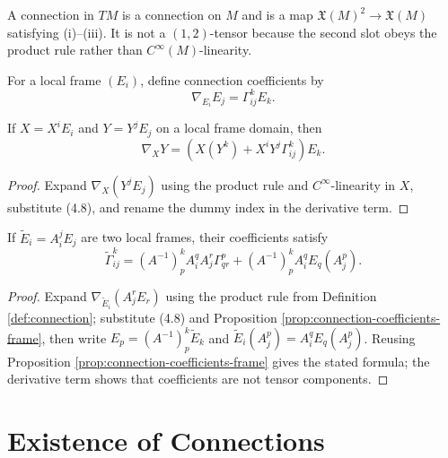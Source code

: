 A connection in $TM$ is a connection on $M$ and is a map $\mathfrak X(M)^2\to\mathfrak X(M)$ satisfying (i)--(iii). It is not a $(1,2)$-tensor because the second slot obeys the product rule rather than $C^\infty(M)$-linearity.

For a local frame $(E_i)$, define connection coefficients by
\begin{equation}
\nabla_{E_i}E_j=\Gamma^k_{ij}E_k.\tag{4.8}
\end{equation}
\begin{proposition}
\label{prop:connection-coefficients-frame}
\leanok
If $X=X^iE_i$ and $Y=Y^jE_j$ on a local frame domain, then
\begin{equation}
\nabla_XY=\left(X(Y^k)+X^iY^j\Gamma^k_{ij}\right)E_k.\tag{4.9}
\end{equation}
\end{proposition}
\begin{proof}
\sketch Expand $\nabla_X(Y^jE_j)$ using the product rule and $C^\infty$-linearity in $X$, substitute (4.8), and rename the dummy index in the derivative term.
\end{proof}

\begin{proposition}
\label{prop:transformation-law-connection-coefficients}
\leanok
If $\widetilde E_i=A^j_iE_j$ are two local frames, their coefficients satisfy
\[
\widetilde\Gamma^k_{ij}=(A^{-1})^k_pA^q_iA^r_j\Gamma^p_{qr}+(A^{-1})^k_pA^q_iE_q(A^p_j).
\]
\end{proposition}
\begin{proof}
\leanok
\sketch Expand $\nabla_{\widetilde E_i}(A^r_jE_r)$ using the product rule from Definition \ref{def:connection}; substitute (4.8) and Proposition \ref{prop:connection-coefficients-frame}, then write $E_p=(A^{-1})^k_p\widetilde E_k$ and $\widetilde E_i(A^p_j)=A^q_iE_q(A^p_j)$. Reusing Proposition \ref{prop:connection-coefficients-frame} gives the stated formula; the derivative term shows that coefficients are not tensor components.
\end{proof}

\section{Existence of Connections}

